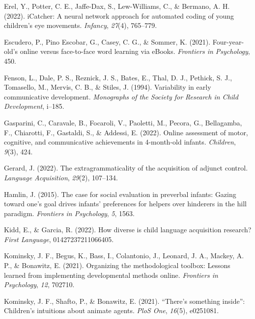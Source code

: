 \documentclass[
  man,floatsintext]{apa6}
\newlength{\cslhangindent}
\newlength{\cslentryspacingunit} %
\newenvironment{CSLReferences}[2] %
 {%
  \setlength{\parindent}{0pt}
  \ifodd #1
  \let\oldpar\par
  \def\par{\hangindent=\cslhangindent\oldpar}
  \fi
  \setlength{\parskip}{#2\cslentryspacingunit}
 }%
 {}
\begin{document}
\begin{CSLReferences}{1}{0}
\leavevmode{}%
Erel, Y., Potter, C. E., Jaffe-Dax, S., Lew-Williams, C., \& Bermano, A. H. (2022). iCatcher: A neural network approach for automated coding of young children's eye movements. \emph{Infancy}, \emph{27}(4), 765--779.

\leavevmode{}%
Escudero, P., Pino Escobar, G., Casey, C. G., \& Sommer, K. (2021). Four-year-old's online versus face-to-face word learning via eBooks. \emph{Frontiers in Psychology}, 450.

\leavevmode{}%
Fenson, L., Dale, P. S., Reznick, J. S., Bates, E., Thal, D. J., Pethick, S. J., Tomasello, M., Mervis, C. B., \& Stiles, J. (1994). Variability in early communicative development. \emph{Monographs of the Society for Research in Child Development}, i--185.

\leavevmode{}%
Gasparini, C., Caravale, B., Focaroli, V., Paoletti, M., Pecora, G., Bellagamba, F., Chiarotti, F., Gastaldi, S., \& Addessi, E. (2022). Online assessment of motor, cognitive, and communicative achievements in 4-month-old infants. \emph{Children}, \emph{9}(3), 424.

\leavevmode{}%
Gerard, J. (2022). The extragrammaticality of the acquisition of adjunct control. \emph{Language Acquisition}, \emph{29}(2), 107--134.

\leavevmode{}%
Hamlin, J. (2015). The case for social evaluation in preverbal infants: Gazing toward one's goal drives infants' preferences for helpers over hinderers in the hill paradigm. \emph{Frontiers in Psychology}, \emph{5}, 1563.

\leavevmode{}%
Kidd, E., \& Garcia, R. (2022). How diverse is child language acquisition research? \emph{First Language}, 01427237211066405.

\leavevmode{}%
Kominsky, J. F., Begus, K., Bass, I., Colantonio, J., Leonard, J. A., Mackey, A. P., \& Bonawitz, E. (2021). Organizing the methodological toolbox: Lessons learned from implementing developmental methods online. \emph{Frontiers in Psychology}, \emph{12}, 702710.

\leavevmode{}%
Kominsky, J. F., Shafto, P., \& Bonawitz, E. (2021). {``There's something inside''}: Children's intuitions about animate agents. \emph{PloS One}, \emph{16}(5), e0251081.


\end{CSLReferences}
\end{document}
